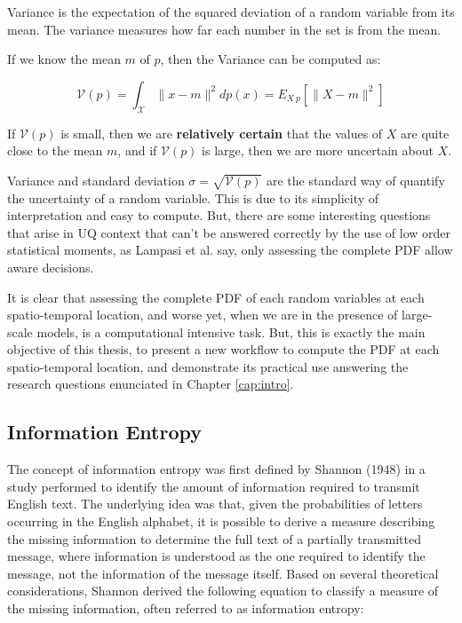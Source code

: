 \begin{defn}
Variance is the expectation of the squared deviation of a random variable from its mean. The variance measures how far each number in the set is from the mean.
\end{defn}

If we know the mean $m$ of $p$, then the Variance can be computed as:

\begin{equation}
\mathcal{V}(\textit{p}) = \int_{\mathcal{X}} \|x-m\|^2dp(x) = E_{X~p}[\|X-m\|^2]
\end{equation}

If $\mathcal{V}(\textit{p})$ is small, then we are \textbf{relatively certain} that the values of $X$ are quite close to the mean $m$, and if $\mathcal{V}(\textit{p})$ is large, then we are more uncertain about $X$.

Variance and standard deviation $\sigma = \sqrt{\mathcal{V}(\textit{p})}$ are the standard way of quantify the uncertainty of a random variable. This is due to its simplicity of interpretation and easy to compute. But, there are some interesting questions that arise in UQ context that can't be answered correctly by the use of low order statistical moments, as Lampasi et al. \cite{Lampasi2006} say, only assessing the complete PDF allow aware decisions. 

It is clear that assessing the complete PDF of each random variables at each spatio-temporal location, and worse yet, when we are in the presence of large-scale models, is a computational intensive task. But, this is exactly the main objective of this thesis, to present a new workflow to compute the PDF at each spatio-temporal location, and demonstrate its practical use answering the research questions enunciated in Chapter \ref{cap:intro}.

\subsection{Information Entropy}
\label{InformationEntropy}
The concept of information entropy was first defined by Shannon (1948) in a study performed to identify the amount of information required to transmit English text. The underlying idea was that, given the probabilities of letters occurring in the English alphabet, it is possible to derive a measure describing the missing information to determine the full text of a partially transmitted message, where information is understood as the one required to identify the message, not the information of the message itself. Based on several theoretical considerations, Shannon derived the following equation to classify a measure of the missing information, often referred to as information entropy:

